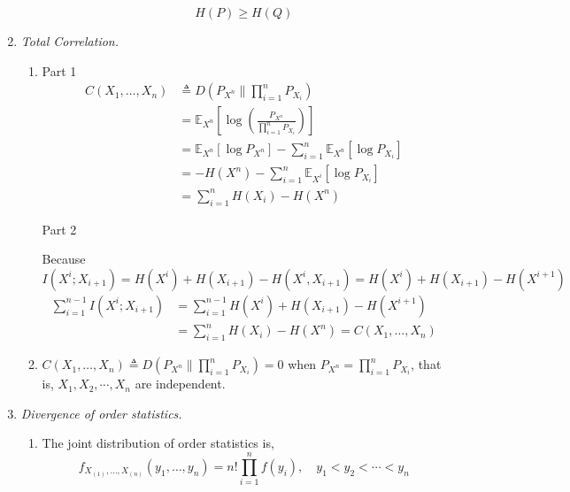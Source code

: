 \documentclass[a4paper]{article}
\begin{document}
\begin{enumerate}
\begin{enumerate}
      \begin{equation}
        H(P) \geqslant H(Q)
      \end{equation}

     \end{enumerate}

     \item \textit{Total Correlation.}
     \begin{enumerate}
       \item Part 1
       \begin{equation}
        \begin{aligned}
          C\left(X_{1}, \ldots, X_{n}\right) & \triangleq D\left(P_{X^{n}} \| \prod_{i=1}^{n} P_{X_{i}}\right) \\
          & = \mathbb{E}_{X^n} [\log \left(\frac{P_{X^n}}{\prod_{i=1}^n P_{X_i}}\right)] \\
          & = \mathbb{E}_{X^n} [\log P_{X^n}] - \sum_{i=1}^n \mathbb{E}_{X^n} [\log P_{X_i}] \\
          & = -H(X^n) - \sum_{i=1}^n \mathbb{E}_{X^i} [\log P_{X_i}] \\
          & = \sum_{i=1}^n H(X_i) -H(X^n)
        \end{aligned}
       \end{equation}

       Part 2

       Because $I(X^i;X_{i+1}) =H(X^i) + H(X_{i+1}) - H(X^i,X_{i+1}) = H(X^i) + H(X_{i+1}) - H(X^{i+1})$
       \begin{equation}
         \begin{aligned}
           \sum_{i=1}^{n-1} I(X^i;X_{i+1}) & = \sum_{i=1}^{n-1}H(X^i) + H(X_{i+1}) - H(X^{i+1}) \\ & = \sum_{i=1}^{n}H(X_i)  - H(X^{n}) =  C\left(X_{1}, \ldots, X_{n}\right)
         \end{aligned}
       \end{equation}

    \item $C\left(X_{1}, \ldots, X_{n}\right) \triangleq D\left(P_{X^{n}} \| \prod_{i=1}^{n} P_{X_{i}}\right) = 0$ when $P_{X^{n}} = \prod_{i=1}^{n} P_{X_{i}}$, that is, $X_1,X_2,\cdots,X_n$ are independent.
    
     \end{enumerate}

     \item \textit{Divergence of order statistics.}
     \begin{enumerate}
       \item The joint distribution of order statistics is, 
       \begin{equation}
        f_{X_{(1)}, \ldots, X_{(n)}}\left(y_{1}, \ldots, y_{n}\right)=n ! \prod_{i=1}^{n} f\left(y_{i}\right), \quad y_{1}<y_{2}<\cdots<y_{n}
       \end{equation}


\end{enumerate}
\end{enumerate}
\end{document}
